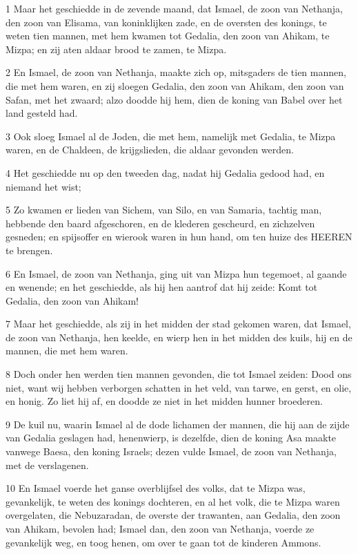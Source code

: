\par 1 Maar het geschiedde in de zevende maand, dat Ismael, de zoon van Nethanja, den zoon van Elisama, van koninklijken zade, en de oversten des konings, te weten tien mannen, met hem kwamen tot Gedalia, den zoon van Ahikam, te Mizpa; en zij aten aldaar brood te zamen, te Mizpa.
\par 2 En Ismael, de zoon van Nethanja, maakte zich op, mitsgaders de tien mannen, die met hem waren, en zij sloegen Gedalia, den zoon van Ahikam, den zoon van Safan, met het zwaard; alzo doodde hij hem, dien de koning van Babel over het land gesteld had.
\par 3 Ook sloeg Ismael al de Joden, die met hem, namelijk met Gedalia, te Mizpa waren, en de Chaldeen, de krijgslieden, die aldaar gevonden werden.
\par 4 Het geschiedde nu op den tweeden dag, nadat hij Gedalia gedood had, en niemand het wist;
\par 5 Zo kwamen er lieden van Sichem, van Silo, en van Samaria, tachtig man, hebbende den baard afgeschoren, en de klederen gescheurd, en zichzelven gesneden; en spijsoffer en wierook waren in hun hand, om ten huize des HEEREN te brengen.
\par 6 En Ismael, de zoon van Nethanja, ging uit van Mizpa hun tegemoet, al gaande en wenende; en het geschiedde, als hij hen aantrof dat hij zeide: Komt tot Gedalia, den zoon van Ahikam!
\par 7 Maar het geschiedde, als zij in het midden der stad gekomen waren, dat Ismael, de zoon van Nethanja, hen keelde, en wierp hen in het midden des kuils, hij en de mannen, die met hem waren.
\par 8 Doch onder hen werden tien mannen gevonden, die tot Ismael zeiden: Dood ons niet, want wij hebben verborgen schatten in het veld, van tarwe, en gerst, en olie, en honig. Zo liet hij af, en doodde ze niet in het midden hunner broederen.
\par 9 De kuil nu, waarin Ismael al de dode lichamen der mannen, die hij aan de zijde van Gedalia geslagen had, henenwierp, is dezelfde, dien de koning Asa maakte vanwege Baesa, den koning Israels; dezen vulde Ismael, de zoon van Nethanja, met de verslagenen.
\par 10 En Ismael voerde het ganse overblijfsel des volks, dat te Mizpa was, gevankelijk, te weten des konings dochteren, en al het volk, die te Mizpa waren overgelaten, die Nebuzaradan, de overste der trawanten, aan Gedalia, den zoon van Ahikam, bevolen had; Ismael dan, den zoon van Nethanja, voerde ze gevankelijk weg, en toog henen, om over te gaan tot de kinderen Ammons.
